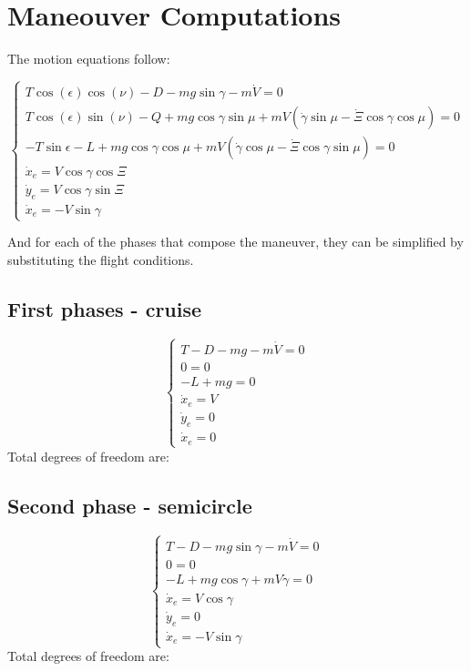 \section*{Maneouver Computations}
The motion equations follow:

\begin{equation*}
	\begin{cases}
	T\cos(\epsilon)\cos(\nu) - D -mg\sin\gamma-m\dot{V}=0\\
	T\cos(\epsilon)\sin(\nu) - Q+mg\cos\gamma\sin\mu+mV(\dot{\gamma}\sin\mu-\dot{\Xi}\cos\gamma\cos\mu)=0\\
	-T\sin\epsilon-L+mg\cos\gamma\cos\mu+mV(\dot{\gamma}\cos\mu-\dot{\Xi}\cos\gamma\sin\mu)=0\\
	\dot{x}_e=V\cos\gamma\cos\Xi\\
	\dot{y}_e=V\cos\gamma\sin\Xi\\
	\dot{x}_e=-V\sin\gamma
	\end{cases}
\end{equation*}

And for each of the phases that compose the maneuver, they can be simplified by substituting the flight conditions.

\subsection*{First phases - cruise}
\begin{equation}
	\begin{cases}
		T - D -mg-m\dot{V}=0\\
		0=0\\
		-L+mg=0\\
		\dot{x}_e=V\\
		\dot{y}_e=0\\
		\dot{x}_e=0
	\end{cases}
\end{equation}
Total degrees of freedom are:

\subsection*{Second phase - semicircle}
\begin{equation}
	\begin{cases}
		T - D -mg\sin\gamma-m\dot{V}=0\\
		0=0\\
		-L+mg\cos\gamma+mV\dot{\gamma}=0\\
		\dot{x}_e=V\cos\gamma\\
		\dot{y}_e=0\\
		\dot{x}_e=-V\sin\gamma
	\end{cases}
\label{eq:semicircle}
\end{equation}
Total degrees of freedom are:


